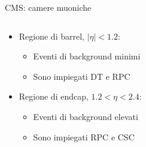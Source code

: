 \documentclass{beamer}
\begin{document}
\begin{frame}{CMS: camere muoniche}

\begin{columns}
    \begin{column}{0.6\textwidth}
    \begin{itemize}
        \item Regione di barrel, $|\eta| < 1.2$:
        \begin{itemize}
            \item Eventi di background minimi
            \item Sono impiegati DT e RPC
        \end{itemize}

        \item Regione di endcap, $1.2 < \eta < 2.4$:
        \begin{itemize}
            \item Eventi di background elevati
            \item Sono impiegati RPC e CSC
        \end{itemize}
    \end{itemize}


    \end{column}

    \begin{column}{0.4\textwidth}
        \centering
        \vspace{0.2cm}
    \end{column}
\end{columns}

    
\end{frame}
\end{document}
